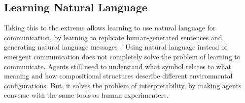 


\subsection{Learning Natural Language}\label{sec:LAMAC:RW_NaturalLang}

Taking this to the extreme allows learning to use natural language for communication, by learning to replicate human-generated sentences and generating natural language messages~\citep{Wang2016_LangGameInteract, Das2017_CoopVisDial, Lewis2017_Deal, Agarwal2019_CommunityRegul, Lee2019_CounteringLDrift, Lazaridou2020_MACNatLang, Gupta2021_DynamicPop}. Using natural language instead of emergent communication does not completely solve the problem of learning to communicate. Agents still need to understand what symbol relates to what meaning and how compositional structures describe different environmental configurations. 
But, it solves the problem of interpretability, by making agents converse with the same tools as human experimenters. 

